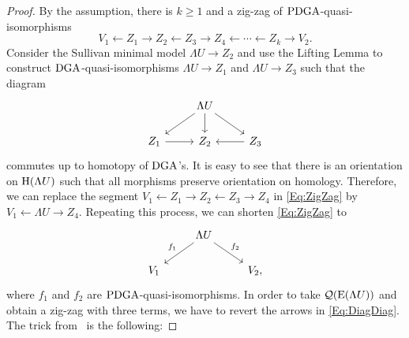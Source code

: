 \documentclass[\MainFolder/Text.tex]{subfiles}
\begin{document}
\begin{proof}
By the assumption, there is $k\ge 1$ and a zig-zag of $\mathrm{PDGA}$-quasi-isomorphisms
\begin{equation}\label{Eq:ZigZag}
V_1 \longleftarrow Z_1 \longrightarrow Z_2 \longleftarrow Z_3 \longrightarrow Z_4 \longleftarrow \dotsb \longleftarrow Z_k \longrightarrow V_2.
\end{equation}
Consider the Sullivan minimal model $\Lambda U \rightarrow Z_2$ and use the Lifting Lemma \cite[Lemma~2.15]{Felix2008} to construct $\mathrm{DGA}$-quasi-isomorphisms $\Lambda U \rightarrow Z_1$ and $\Lambda U \rightarrow Z_3$ such that the diagram
$$\begin{tikzcd}
& \Lambda U \arrow{d} \arrow{ld} \arrow{rd} & \\
Z_1 \arrow{r} & Z_2 & \arrow{l} Z_3
\end{tikzcd}$$
commutes up to homotopy of $\mathrm{DGA}$'s. It is easy to see that there is an orientation on $\mathrm{H}(\Lambda U)$ such that all morphisms preserve orientation on homology. Therefore, we can replace the segment $V_1 \longleftarrow Z_1 \longrightarrow Z_2 \longleftarrow Z_3 \longrightarrow Z_4$ in \eqref{Eq:ZigZag} by $V_1 \longleftarrow \Lambda U \longrightarrow Z_4$. Repeating this process, we can shorten \eqref{Eq:ZigZag} to 
\begin{equation}\label{Eq:DiagDiag}
\begin{tikzcd}
& \Lambda U \arrow{dr}{f_2} \arrow[swap]{dl}{f_1} & \\
V_1 & & V_2,
\end{tikzcd}
\end{equation}
where $f_1$ and $f_2$ are $\mathrm{PDGA}$-quasi-isomorphisms. In order to take $\mathcal{Q}(\mathrm{E}(\Lambda U))$ and obtain a zig-zag with three terms, we have to revert the arrows in \eqref{Eq:DiagDiag}. The trick from~\cite{Lambrechts2007} is the following:


\end{proof}
\end{document}
